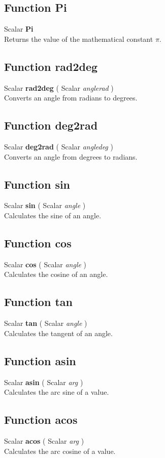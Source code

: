 \documentclass[10pt]{book}
\begin{document}
\subsection{Function Pi \label{F:Pi}}
Scalar \textbf{Pi} \\
Returns the value of the mathematical constant $\pi$.

\subsection{Function rad2deg \label{F:rad2deg}}
Scalar \textbf{rad2deg} ( Scalar \textit{anglerad} ) \\
Converts an angle from radians to degrees.

\subsection{Function deg2rad \label{F:deg2rad}}
Scalar \textbf{deg2rad} ( Scalar \textit{angledeg} ) \\
Converts an angle from degrees to radians.

\subsection{Function sin \label{F:sin}}
Scalar \textbf{sin} ( Scalar \textit{angle} ) \\
Calculates the sine of an angle.

\subsection{Function cos \label{F:cos}}
Scalar \textbf{cos} ( Scalar \textit{angle} ) \\
Calculates the cosine of an angle.

\subsection{Function tan \label{F:tan}}
Scalar \textbf{tan} ( Scalar \textit{angle} ) \\
Calculates the tangent of an angle.

\subsection{Function asin \label{F:asin}}
Scalar \textbf{asin} ( Scalar \textit{arg} ) \\
Calculates the arc sine of a value.

\subsection{Function acos \label{F:acos}}
Scalar \textbf{acos} ( Scalar \textit{arg} ) \\
Calculates the arc cosine of a value.
\end{document}
